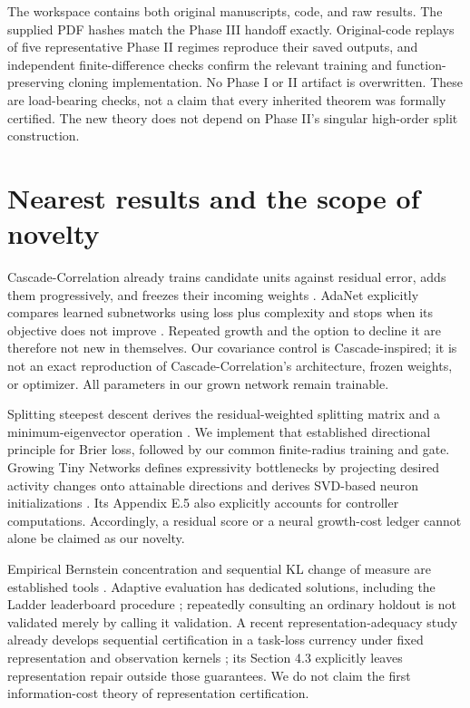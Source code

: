 \documentclass[11pt]{article}
\theoremstyle{remark}\newtheorem{remark}[theorem]{Remark}
\begin{document}
The workspace contains both original manuscripts, code, and raw results.
The supplied PDF hashes match the Phase III handoff exactly. Original-code
replays of five representative Phase II regimes reproduce their saved
outputs, and independent finite-difference checks confirm the relevant
training and function-preserving cloning implementation. No Phase I or II
artifact is overwritten. These are load-bearing checks, not a claim that
every inherited theorem was formally certified. The new theory does not
depend on Phase II's singular high-order split construction.

\section{Nearest results and the scope of novelty}
Cascade-Correlation already trains candidate units against residual error,
adds them progressively, and freezes their incoming weights
\cite{fahlman1990}. AdaNet explicitly compares learned subnetworks using loss
plus complexity and stops when its objective does not improve
\cite[Section 5.2, Figure 3]{cortes2017adanet}. Repeated growth and the option
to decline it are therefore not new in themselves. Our covariance control is
Cascade-inspired; it is not an exact reproduction of Cascade-Correlation's
architecture, frozen weights, or optimizer. All parameters in our grown
network remain trainable.

Splitting steepest descent derives the residual-weighted splitting matrix
and a minimum-eigenvector operation
\cite[Section 2.1, Definition 2.1]{ssd2019}. We implement that established
directional principle for Brier loss, followed by our common finite-radius
training and gate. Growing Tiny Networks defines expressivity bottlenecks by
projecting desired activity changes onto attainable directions and derives
SVD-based neuron initializations
\cite[Definition 3.1, Propositions 3.1--3.3]{verbockhaven2024growing}.
Its Appendix E.5 also explicitly accounts for controller computations.
Accordingly, a residual score or a neural growth-cost ledger cannot alone be
claimed as our novelty.

Empirical Bernstein concentration and sequential KL change of measure are
established tools \cite{maurer2009,kaufmann2016}. Adaptive evaluation has
dedicated solutions, including the Ladder leaderboard procedure
\cite{blum2015}; repeatedly consulting an ordinary holdout is not validated
merely by calling it validation. A recent representation-adequacy study
already develops sequential certification in a task-loss currency under
fixed representation and observation kernels
\cite[Section 3, Theorems 8--9]{huang2026selfcertification}; its Section 4.3 explicitly leaves
representation repair outside those guarantees. We do not claim the first
information-cost theory of representation certification.
\end{document}
